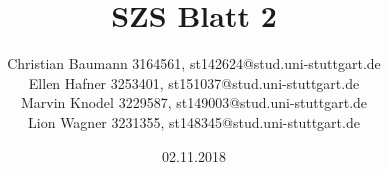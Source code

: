 \documentclass[a4paper, 15pt]{scrartcl}
\title{SZS Blatt 2}
\author{
	Christian Baumann 3164561, st142624@stud.uni-stuttgart.de \\ 
	Ellen Hafner 3253401, st151037@stud.uni-stuttgart.de \\ 
	Marvin Knodel 3229587, st149003@stud.uni-stuttgart.de\\ 
	Lion Wagner 3231355, st148345@stud.uni-stuttgart.de}
\date{02.11.2018}
\begin{document}
	\maketitle
	\newpage
		\mbox{}
		
	\newpage
		
	\newpage
		
	\newpage
		
\end{document}
